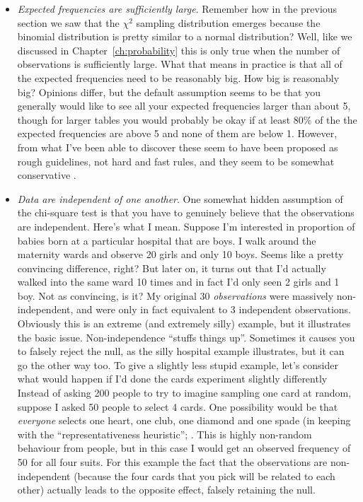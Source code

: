 \begin{itemize}
\item {\it Expected frequencies are sufficiently large}. Remember how in the previous section we saw that the $\chi^2$ sampling distribution emerges because the binomial distribution is pretty similar to a normal distribution? Well, like we discussed in Chapter~\ref{ch:probability} this is only true when the number of observations is sufficiently large. What that means in practice is that all of the expected frequencies need to be reasonably big. How big is reasonably big? Opinions differ, but the default assumption seems to be that you generally would like to see all your expected frequencies larger than about 5, though for larger tables you would probably be okay if at least 80\% of the the expected frequencies are above 5 and none of them are below 1. However, from what I've been able to discover \parencite[e.g.,][]{Cochran1954} these seem to have been proposed as rough guidelines, not hard and fast rules, and they seem to be somewhat conservative \parencite{Larntz1978}. 
\item {\it Data are independent of one another}. One somewhat hidden assumption of the chi-square test is that you have to genuinely believe that the observations are independent. Here's what I mean. Suppose I'm interested in proportion of babies born at a particular hospital that are boys. I walk around the maternity wards and observe 20 girls and only 10 boys. Seems like a pretty convincing difference, right? But later on, it turns out that I'd actually walked into the same ward 10 times and in fact I'd only seen 2 girls and 1 boy. Not as convincing, is it? My original 30 {\it observations} were massively non-independent, and were only in fact equivalent to 3 independent observations. Obviously this is an extreme (and extremely silly) example, but it illustrates the basic issue. Non-independence ``stuffs things up''. Sometimes it causes you to falsely reject the null, as the silly hospital example illustrates, but it can go the other way too. To give a slightly less stupid example, let's consider what would happen if I'd done the cards experiment slightly differently Instead of asking 200 people to try to imagine sampling one card at random, suppose I asked 50 people to select 4 cards. One possibility would be that {\it everyone} selects one heart, one club, one diamond and one spade (in keeping with the ``representativeness heuristic''; \textcite{Tversky1974}. This is highly non-random behaviour from people, but in this case I would get an observed frequency of 50 for all four suits. For this example the fact that the observations are non-independent (because the four cards that you pick will be related to each other) actually leads to the opposite effect, falsely retaining the null.
\end{itemize}

